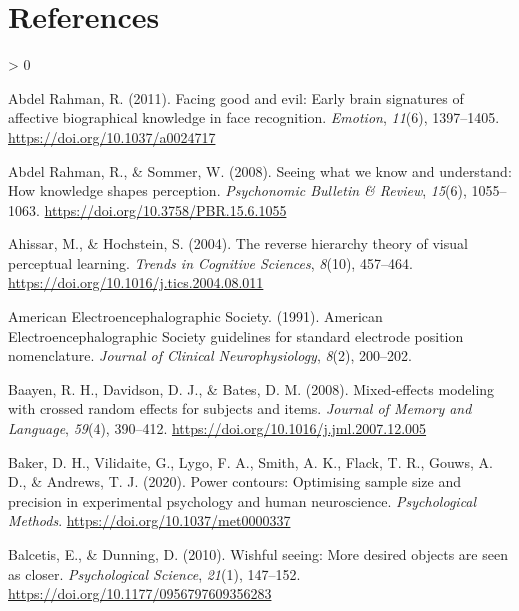 \documentclass[
  english,
  doc,12pt,twoside,floatsintext]{apa7}
\newlength{\cslhangindent}
\newenvironment{CSLReferences}[2] %
 {%
  \setlength{\parindent}{0pt}
  \ifodd #1 \everypar{\setlength{\hangindent}{\cslhangindent}}\ignorespaces\fi
  \ifnum #2 > 0
  \setlength{\parskip}{#2\baselineskip}
  \fi
 }%
 {}
\begin{document}
\newpage

\hypertarget{references}{%
\section{References}\label{references}}

\setlength{\parindent}{-0.5in}

\raggedright
\setlength{\cslhangindent}{0.5in}

\hypertarget{refs}{}
\begin{CSLReferences}{1}{0}
\leavevmode\hypertarget{ref-abdelrahman2011}{}%
Abdel Rahman, R. (2011). Facing good and evil: Early brain signatures of affective biographical knowledge in face recognition. \emph{Emotion}, \emph{11}(6), 1397--1405. \url{https://doi.org/10.1037/a0024717}

\leavevmode\hypertarget{ref-abdelrahman2008}{}%
Abdel Rahman, R., \& Sommer, W. (2008). Seeing what we know and understand: How knowledge shapes perception. \emph{Psychonomic Bulletin \& Review}, \emph{15}(6), 1055--1063. \url{https://doi.org/10.3758/PBR.15.6.1055}

\leavevmode\hypertarget{ref-ahissar2004}{}%
Ahissar, M., \& Hochstein, S. (2004). The reverse hierarchy theory of visual perceptual learning. \emph{Trends in Cognitive Sciences}, \emph{8}(10), 457--464. \url{https://doi.org/10.1016/j.tics.2004.08.011}

\leavevmode\hypertarget{ref-americanelectroencephalographicsociety1991}{}%
American Electroencephalographic Society. (1991). {American Electroencephalographic Society} guidelines for standard electrode position nomenclature. \emph{Journal of Clinical Neurophysiology}, \emph{8}(2), 200--202.

\leavevmode\hypertarget{ref-baayen2008}{}%
Baayen, R. H., Davidson, D. J., \& Bates, D. M. (2008). Mixed-effects modeling with crossed random effects for subjects and items. \emph{Journal of Memory and Language}, \emph{59}(4), 390--412. \url{https://doi.org/10.1016/j.jml.2007.12.005}

\leavevmode\hypertarget{ref-baker2020}{}%
Baker, D. H., Vilidaite, G., Lygo, F. A., Smith, A. K., Flack, T. R., Gouws, A. D., \& Andrews, T. J. (2020). Power contours: Optimising sample size and precision in experimental psychology and human neuroscience. \emph{Psychological Methods}. \url{https://doi.org/10.1037/met0000337}

\leavevmode\hypertarget{ref-balcetis2010}{}%
Balcetis, E., \& Dunning, D. (2010). Wishful seeing: More desired objects are seen as closer. \emph{Psychological Science}, \emph{21}(1), 147--152. \url{https://doi.org/10.1177/0956797609356283}


\end{CSLReferences}
\end{document}
